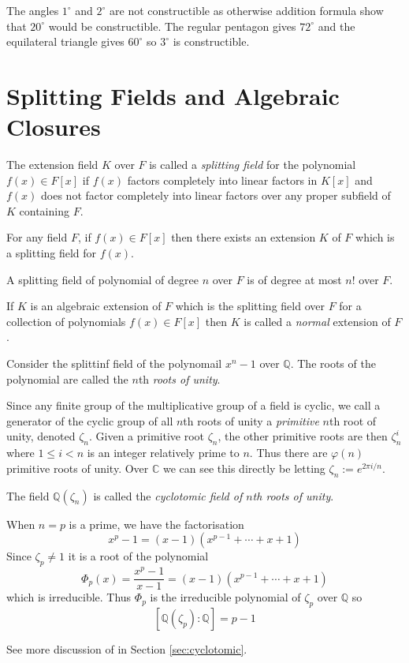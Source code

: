 \documentclass[a4paper]{article}
\begin{document}
\begin{rmk}
  The angles $1^\circ$ and $2^\circ$ are not constructible as otherwise addition formula show that $20^\circ$ would be constructible. The regular pentagon gives $72^\circ$ and the equilateral triangle gives $60^\circ$ so $3^\circ$ is constructible.
\end{rmk}

\section{Splitting Fields and Algebraic Closures}

\begin{defi}
  The extension field $K$ over $F$ is called a \emph{splitting field} for the polynomial $f(x)\in F[x]$ if $f(x)$ factors completely into linear factors in $K[x]$ and $f(x)$ does not factor completely into linear factors over any proper subfield of $K$ containing $F$.
\end{defi}

\begin{thm}
  For any field $F$, if $f(x)\in F[x]$ then there exists an extension $K$ of $F$ which is a splitting field for $f(x)$.
\end{thm}

\begin{prop}
  A splitting field of polynomial of degree $n$ over $F$ is of degree at most $n!$ over $F$.
\end{prop}

\begin{defi}
  If $K$ is an algebraic extension of $F$ which is the splitting field over $F$ for a collection of polynomials $f(x)\in F[x]$ then $K$ is called a \emph{normal} extension of $F$.
\end{defi}

\begin{eg}
  Consider the splittinf field of the polynomail $x^n-1$ over $\mathbb{Q}$. The roots of the polynomial are called the $n$th \emph{roots of unity}.

  Since any finite group of the multiplicative group of a field is cyclic, we call a generator of the cyclic group of all $n$th roots of unity a \emph{primitive} $n$th root of unity, denoted $\zeta_n$. Given a primitive root $\zeta_n$, the other primitive roots are then $\zeta_n^i$ where $1 \leq i < n$ is an integer relatively prime to $n$. Thus there are $\varphi(n)$ primitive roots of unity. Over $\mathbb{C}$ we can see this directly be letting $\zeta_n:=e^{2\pi i/n}$.

  The field $\mathbb{Q}(\zeta_n)$ is called the \emph{cyclotomic field of $n$th roots of unity}.

  When $n=p$ is a prime, we have the factorisation
  \[
    x^p-1 = (x-1)(x^{p-1}+\cdots+x+1)
  \]
  Since $\zeta_p \neq 1$ it is a root of the polynomial
  \[
    \Phi_p(x) = \frac{x^p-1}{x-1} = (x-1)(x^{p-1}+\cdots+x+1)
  \]
  which is irreducible. Thus $\Phi_p$ is the irreducible polynomial of $\zeta_p$ over $\mathbb{Q}$ so
  \[[\mathbb{Q}(\zeta_p):\mathbb{Q}] = p-1\]

  See more discussion of in Section \ref{sec:cyclotomic}.
\end{eg}
\end{document}
